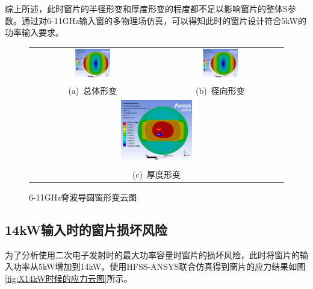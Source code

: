 \documentclass[master]{thesis-uestc}
\begin{document}
综上所述，此时窗片的半径形变和厚度形变的程度都不足以影响窗片的整体S参数。通过对6-11GHz输入窗的多物理场仿真，可以得知此时的窗片设计符合5kW的功率输入要求。
\begin{figure}[!htb]
    \small
    \centering
    \begin{tabular}{@{\ }c@{\ }c}
        \includegraphics[width=0.29\textwidth]{pic/chapter3/X输入窗总形变.png} & 
        \hspace{5pt}
        \includegraphics[width=0.29\textwidth]{pic/chapter3/X输入窗径向形变.png}     \\
        \mbox{\small (a) 总体形变}                                                                               & 
        \mbox{\small (b) 径向形变}                                                           \\[6bp]
        \multicolumn{2}{c}{\includegraphics[width=0.29\textwidth]{pic/chapter3/X输入窗厚度形变.png}} \\  %
        \multicolumn{2}{c}{\mbox{\small (c) 厚度形变}}             
    \end{tabular}
    \caption{6-11GHz脊波导圆窗形变云图}
    \label{fig:X输入窗形变}
\end{figure}

\subsection{14kW输入时的窗片损坏风险}
为了分析使用二次电子发射时的最大功率容量时窗片的损坏风险，此时将窗片的输入功率从5kW增加到14kW。使用HFSS-ANSYS联合仿真得到窗片的应力结果如图\ref{fig:X14kW时候的应力云图}所示。
\end{document}

